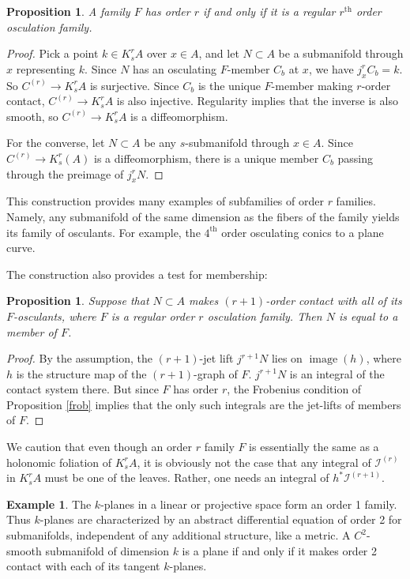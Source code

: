 \documentclass[12pt]{article}
\numberwithin{equation}{section}
\theoremstyle{plain}
\newtheorem{proposition}[definition]{Proposition}
\theoremstyle{definition}
\newtheorem{example}[definition]{Example}
\newcommand{\im}{\operatorname{image}}
\newcommand{\ra}{\rightarrow}
\begin{document}
\begin{proposition}\label{idosculation} A family $F$ has order $r$ if and only if it is a regular $r^{\text{th}}$ order osculation family.
\end{proposition}
\begin{proof} Pick a point $k\in K^{r}_{s}A$ over $x\in A$, and let $N\subset A$ be a submanifold through $x$ representing $k$. Since $N$ has an osculating $F$-member $C_b$ at $x$, we have $j^{r}_xC_b=k$. So $C^{(r)}\ra K^{r}_{s}A$ is surjective. Since $C_b$ is the unique $F$-member making $r$-order contact, $C^{(r)}\ra K^{r}_{s}A$ is also injective. Regularity implies that the inverse is also smooth, so $C^{(r)}\ra K^{r}_{s}A$ is a diffeomorphism.

For the converse, let $N\subset A$ be any $s$-submanifold through $x\in A$. Since $C^{(r)}\ra K^{r}_{s}(A)$ is a diffeomorphism, there is a unique member $C_b$ passing through the preimage of $j^{r}_{x}N$.
\end{proof}
This construction provides many examples of subfamilies of order $r$ families. Namely, any submanifold of the same dimension as the fibers of the family yields its family of osculants. For example, the $4^{\text{th}}$ order osculating conics to a plane curve.

The construction also provides a test for membership:
\begin{proposition}
Suppose that $N\subset A$ makes $(r+1)$-order contact with all of its $F$-osculants, where $F$ is a regular order $r$ osculation family. Then $N$ is equal to a member of $F$.
\end{proposition}
\begin{proof}
By the assumption, the $(r+1)$-jet lift $j^{r+1}N$ lies on $\im(h)$, where $h$ is the structure map of the $(r+1)$-graph of $F$. $j^{r+1}N$ is an integral of the contact system there. But since $F$ has order $r$, the Frobenius condition of Proposition \ref{frob} implies that the only such integrals are the jet-lifts of members of $F$.
\end{proof}

We caution that even though an order $r$ family $F$ is essentially the same as a holonomic foliation of $K^{r}_{s}A$, it is obviously not the case that any integral of $\mathcal{I}^{(r)}$ in $K^{r}_{s}A$ must be one of the leaves. Rather, one needs an integral of $h^{*}\mathcal{I}^{(r+1)}$.



\begin{example} The $k$-planes in a linear or projective space form an order 1 family. Thus $k$-planes are characterized by an abstract differential equation of order 2 for submanifolds, independent of any additional structure, like a metric. A $C^{2}$-smooth submanifold of dimension $k$ is a plane if and only if it makes order 2 contact with each of its tangent $k$-planes.
\end{example}
\end{document}
